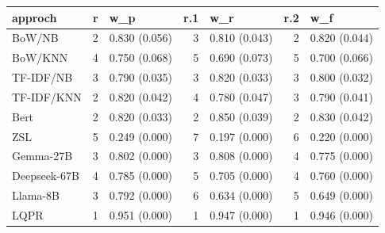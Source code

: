 \begin{tabular}{lrlrlrl}
\hline
 approch      &   r & w\_p           &   r.1 & w\_r           &   r.2 & w\_f           \\
\hline
 BoW/NB       &   2 & 0.830 (0.056) &     3 & 0.810 (0.043) &     2 & 0.820 (0.044) \\
 BoW/KNN      &   4 & 0.750 (0.068) &     5 & 0.690 (0.073) &     5 & 0.700 (0.066) \\
 TF-IDF/NB    &   3 & 0.790 (0.035) &     3 & 0.820 (0.033) &     3 & 0.800 (0.032) \\
 TF-IDF/KNN   &   2 & 0.820 (0.042) &     4 & 0.780 (0.047) &     3 & 0.790 (0.041) \\
 Bert         &   2 & 0.820 (0.033) &     2 & 0.850 (0.039) &     2 & 0.830 (0.042) \\
 ZSL          &   5 & 0.249 (0.000) &     7 & 0.197 (0.000) &     6 & 0.220 (0.000) \\
 Gemma-27B    &   3 & 0.802 (0.000) &     3 & 0.808 (0.000) &     4 & 0.775 (0.000) \\
 Deepseek-67B &   4 & 0.785 (0.000) &     5 & 0.705 (0.000) &     4 & 0.760 (0.000) \\
 Llama-8B     &   3 & 0.792 (0.000) &     6 & 0.634 (0.000) &     5 & 0.649 (0.000) \\
 LQPR         &   1 & 0.951 (0.000) &     1 & 0.947 (0.000) &     1 & 0.946 (0.000) \\
\hline
\end{tabular}